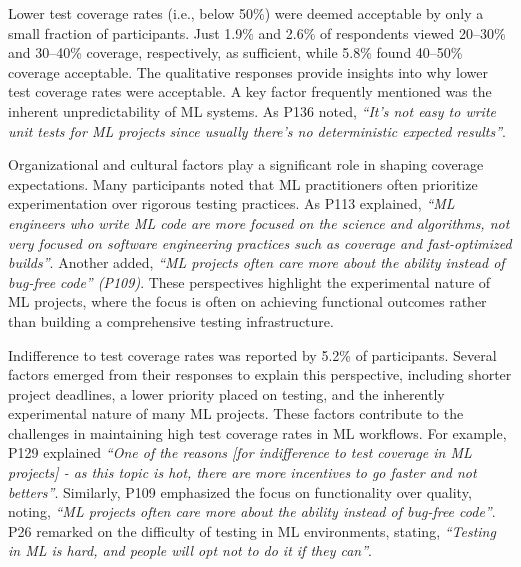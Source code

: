 Lower test coverage rates (i.e., below 50\%) were deemed acceptable by only a small fraction of participants. Just 1.9\% and 2.6\% of respondents viewed 20–30\% and 30–40\% coverage, respectively, as sufficient, while 5.8\% found 40–50\% coverage acceptable. 
The qualitative responses provide insights into why lower test coverage rates were acceptable. A key factor frequently mentioned was the inherent unpredictability of ML systems. As P136 noted, \textit{``It's not easy to write unit tests for ML projects since usually there's no deterministic expected results''}. 

Organizational and cultural factors play a significant role in shaping coverage expectations. Many participants noted that ML practitioners often prioritize experimentation over rigorous testing practices. As P113 explained, \textit{``ML engineers who write ML code are more focused on the science and algorithms, not very focused on software engineering practices such as coverage and fast-optimized builds''}. Another added, \textit{``ML projects often care more about the ability instead of bug-free code'' (P109)}. These perspectives highlight the experimental nature of ML projects, where the focus is often on achieving functional outcomes rather than building a comprehensive testing infrastructure.

Indifference to test coverage rates was reported by 5.2\% of participants. Several factors emerged from their responses to explain this perspective, including shorter project deadlines, a lower priority placed on testing, and the inherently experimental nature of many ML projects. These factors contribute to the challenges in maintaining high test coverage rates in ML workflows.
For example, P129 explained
\textit{``One of the reasons [for indifference to test coverage in ML projects] - as this topic is hot, there are more incentives to go faster and not betters''}. Similarly, P109 emphasized the focus on functionality over quality, noting, \textit{``ML projects often care more about the ability instead of bug-free code''}. P26 remarked on the difficulty of testing in ML environments, stating, \textit{``Testing in ML is hard, and people will opt not to do it if they can''}.

